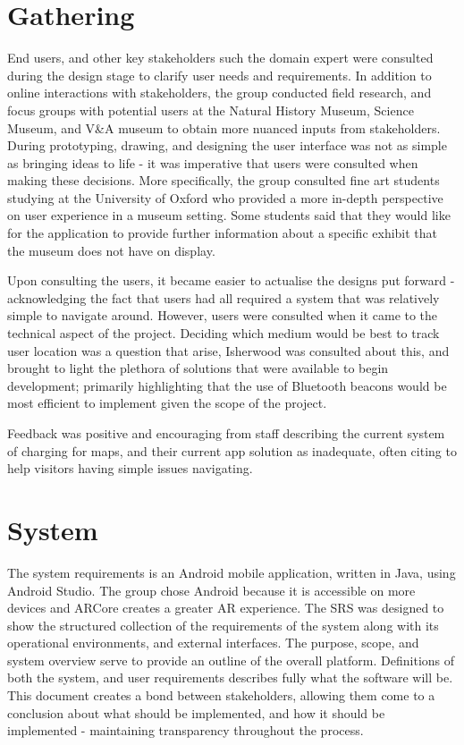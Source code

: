 \section{Gathering}
End users, and other key stakeholders such the domain expert were consulted during the design stage to clarify user needs and requirements. In addition to online interactions with stakeholders, the group conducted field research, and focus groups with potential users at the Natural History Museum, Science Museum, and V\&A museum to obtain more nuanced inputs from stakeholders. During prototyping, drawing, and designing the user interface was not as simple as bringing ideas to life - it was imperative that users were consulted when making these decisions. More specifically, the group consulted fine art students studying at the University of Oxford who provided a more in-depth perspective on user experience in a museum setting. Some students said that they would like for the application to provide further information about a specific exhibit that the museum does not have on display.

Upon consulting the users, it became easier to actualise the designs put forward - acknowledging the fact that users had all required a system that was relatively simple to navigate around. However, users were consulted when it came to the technical aspect of the project. Deciding which medium would be best to track user location was a question that arise, Isherwood was consulted about this, and brought to light the plethora of solutions that were available to begin development; primarily highlighting that the use of Bluetooth beacons would be most efficient to implement given the scope of the project.

Feedback was positive and encouraging from staff describing the current system of charging for maps, and their current app solution as inadequate, often citing to help visitors having simple issues navigating.

\section{System}
The system requirements is an Android mobile application, written in Java, using Android Studio. The group chose Android because it is accessible on more devices and ARCore creates a greater AR experience. The SRS was designed to show the structured collection of the requirements of the system along with its operational environments, and external interfaces. The purpose, scope, and system overview serve to provide an outline of the overall platform. Definitions of both the system, and user requirements describes fully what the software will be. This document creates a bond between stakeholders, allowing them come to a conclusion about what should be implemented, and how it should be implemented - maintaining transparency throughout the process.

